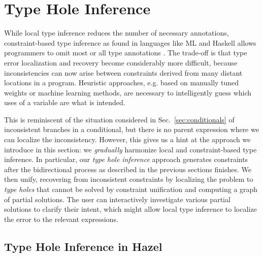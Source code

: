 \section{Type Hole Inference}
\label{sec:thi}

While local type inference reduces the number of necessary annotations, 
constraint-based type inference as found in languages like ML and Haskell allows programmers to omit most or all type annotations \cite{HM, pierce}. The trade-off is that type error localization and recovery 
become considerably more difficult, because inconsistencies can now arise between 
constraints derived from many distant locations in a program. 
Heuristic approaches, e.g. based on manually tuned weights or machine learning methods, are necessary to intelligently guess which uses of a variable are what is  intended.

This is reminiscent of the situation considered in Sec.~\ref{sec:conditionals} of inconsistent branches in a conditional, but there is no parent expression where we can localize the inconsistency. However,
this gives us a hint at the approach we introduce in this section: we \emph{gradually} harmonize local and constraint-based type inference. In particular, our \emph{type hole inference} approach generates constraints after the bidirectional process as described in the previous sections finishes. We then unify, recovering from inconsistent constraints by localizing the problem 
to \emph{type holes} that cannot be solved by constraint unification and computing a graph of partial solutions. The user can  interactively investigate various partial solutions to clarify their intent, which might allow local type inference to localize the error to the relevant expressions. 


\subsection{Type Hole Inference in Hazel}

